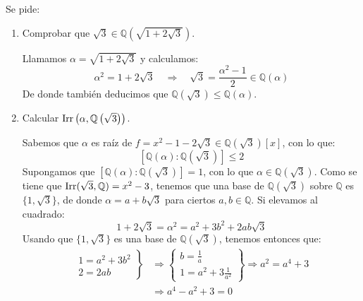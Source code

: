 \begin{ejercicio} %
    Se pide:
    \begin{enumerate}
        \item Comprobar que $\sqrt{3}\in \mathbb{Q}\left(\sqrt{1+2\sqrt{3}}\right)$.

            Llamamos $\alpha = \sqrt{1+2\sqrt{3}}$ y calculamos:
            \begin{equation*}
                \alpha^2 = 1+2\sqrt{3} \quad \Longrightarrow \quad  \sqrt{3} = \dfrac{\alpha^{2}-1}{2}\in \mathbb{Q}(\alpha)
            \end{equation*}
            De donde también deducimos que $\mathbb{Q}(\sqrt{3})\leq \mathbb{Q}(\alpha)$.
        \item Calcular $\operatorname{Irr}\left(\alpha, \mathbb{Q}\left(\sqrt{3}\right)\right)$.

            Sabemos que $\alpha$ es raíz de $f=x^2-1-2\sqrt{3}\in \mathbb{Q}\left(\sqrt{3}\right)[x]$, con lo que:
            \begin{equation*}
                \left[\mathbb{Q}(\alpha):\mathbb{Q}\left(\sqrt{3}\right)\right] \leq 2
            \end{equation*}
            Supongamos que $\left[\mathbb{Q}(\alpha):\mathbb{Q}\left(\sqrt{3}\right)\right]=1$, con lo que $\alpha\in \mathbb{Q}\left(\sqrt{3}\right)$. Como se tiene que $\operatorname{Irr}(\sqrt{3},\mathbb{Q}) = x^2-3$, tenemos que una base de $\mathbb{Q}\left(\sqrt{3}\right)$ sobre $\mathbb{Q}$ es $\{1,\sqrt{3}\}$, de donde $\alpha = a + b\sqrt{3}$ para ciertos $a,b\in \mathbb{Q}$. Si elevamos al cuadrado:
            \begin{equation*}
                1 + 2\sqrt{3} = \alpha^2 = a^2 + 3b^2 + 2ab\sqrt{3}
            \end{equation*}
            Usando que $\{1,\sqrt{3}\}$ es una base de $\mathbb{Q}\left(\sqrt{3}\right)$, tenemos entonces que:
            \begin{align*}
                \left.\begin{array}{l}
                    1 = a^2 + 3b^2 \\
                    2 = 2 ab
                    \end{array}\right\} &\Longrightarrow \left\{\begin{array}{l}
                    b = \frac{1}{a} \\
                    1 = a^2 + 3\frac{1}{a^2}
            \end{array}\right\} \Longrightarrow a^2 = a^4 + 3 \\ &\Longrightarrow a^4 - a^2 + 3 = 0
            \end{align*}


\end{enumerate}
\end{ejercicio}
